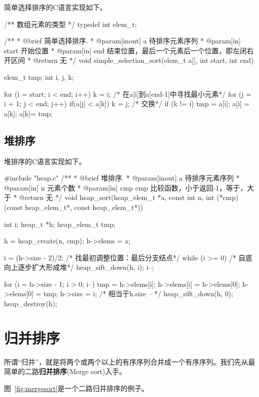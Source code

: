 简单选择排序的C语言实现如下。
\begin{Codex}[label=simple_selection_sort.c]
/** 数组元素的类型 */
typedef int elem_t;

/**
  * @brief 简单选择排序.
  * @param[inout] a 待排序元素序列
  * @param[in] start 开始位置
  * @param[in] end 结束位置，最后一个元素后一个位置，即左闭右开区间
  * @return 无
  */
void simple_selection_sort(elem_t a[], int start, int end) {
    elem_t tmp;
    int i, j, k;

    for (i = start; i < end; i++) {
        k = i;
        /* 在a[i]到a[end-1]中寻找最小元素*/
        for (j = i + 1; j < end; j++)
            if(a[j] < a[k]) k = j;
        /* 交换*/
        if (k != i) {
            tmp = a[i];
            a[i] = a[k];
            a[k]= tmp;
        }
    }
}
\end{Codex}


\subsection{堆排序}
堆排序的C语言实现如下。
\begin{Codex}[label=heap_sort.c]
#include "heap.c"
/**
  * @brief 堆排序.
  * @param[inout] a 待排序元素序列
  * @param[in] n 元素个数
  * @param[in] cmp cmp 比较函数，小于返回-1，等于，大于
  * @return 无
  */
void heap_sort(heap_elem_t *a, const int n, 
               int (*cmp)(const heap_elem_t*, const heap_elem_t*)) {
    int i;
    heap_t *h;
    heap_elem_t tmp;

    h = heap_create(n, cmp);
    h->elems = a;

    i = (h->size - 2)/2;   /* 找最初调整位置：最后分支结点*/
    while (i >= 0) {  /* 自底向上逐步扩大形成堆*/
        heap_sift_down(h, i);
        i--;
    }

    for (i = h->size - 1; i > 0; i--) {
        tmp = h->elems[i];
        h->elems[i] = h->elems[0];
        h->elems[0] = tmp;
        h->size = i; /* 相当于h.size -- */
        heap_sift_down(h, 0);
    }
    heap_destroy(h);
}
\end{Codex}


\section{归并排序} %
所谓“归并”，就是将两个或两个以上的有序序列合并成一个有序序列。我们先从最简单的二路\textbf{归并排序}(Merge sort)入手。

图~\ref{fig:mergesort}是一个二路归并排序的例子。

